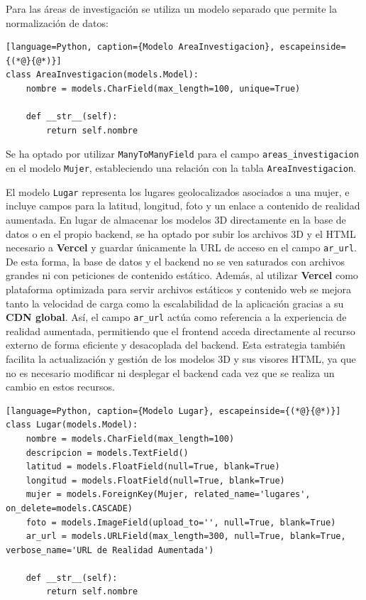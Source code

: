 Para las áreas de investigación se utiliza un modelo separado que permite la normalización de datos:

\begin{lstlisting}[language=Python, caption={Modelo AreaInvestigacion}, escapeinside={(*@}{@*)}]
class AreaInvestigacion(models.Model):
    nombre = models.CharField(max_length=100, unique=True)

    def __str__(self):
        return self.nombre
\end{lstlisting}

Se ha optado por utilizar \texttt{ManyToManyField} para el campo \texttt{areas\_investigacion} en el modelo \texttt{Mujer}, estableciendo una relación con la tabla \texttt{AreaInvestigacion}. 

El modelo \texttt{Lugar} representa los lugares geolocalizados asociados a una mujer, e incluye campos para la latitud, longitud, foto y un enlace a contenido de realidad aumentada.
En lugar de almacenar los modelos 3D directamente en la base de datos o en el propio backend, se ha optado por subir los archivos 3D y el HTML necesario a \textbf{Vercel} y guardar únicamente la URL de acceso en el campo \texttt{ar\_url}. De esta forma, la base de datos y el backend no se ven saturados con archivos grandes ni con peticiones de contenido estático. Además, al utilizar \textbf{Vercel} como plataforma optimizada para servir archivos estáticos y contenido web se mejora tanto la velocidad de carga como la escalabilidad de la aplicación gracias a su \textbf{CDN global}. Así, el campo \texttt{ar\_url} actúa como referencia a la experiencia de realidad aumentada, permitiendo que el frontend acceda directamente al recurso externo de forma eficiente y desacoplada del backend. Esta estrategia también facilita la actualización y gestión de los modelos 3D y sus visores HTML, ya que no es necesario modificar ni desplegar el backend cada vez que se realiza un cambio en estos recursos.

\begin{lstlisting}[language=Python, caption={Modelo Lugar}, escapeinside={(*@}{@*)}]
class Lugar(models.Model):
    nombre = models.CharField(max_length=100)
    descripcion = models.TextField()
    latitud = models.FloatField(null=True, blank=True)
    longitud = models.FloatField(null=True, blank=True)
    mujer = models.ForeignKey(Mujer, related_name='lugares', on_delete=models.CASCADE)
    foto = models.ImageField(upload_to='', null=True, blank=True)
    ar_url = models.URLField(max_length=300, null=True, blank=True, verbose_name='URL de Realidad Aumentada')

    def __str__(self):
        return self.nombre
\end{lstlisting}

